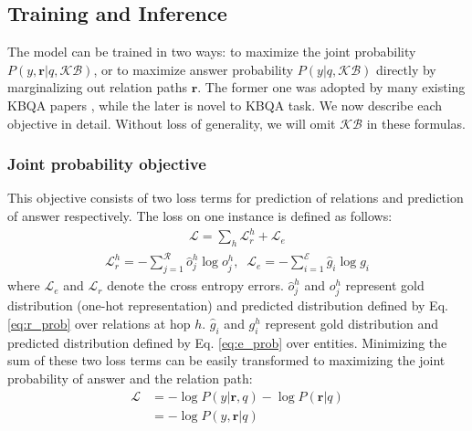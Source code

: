 \subsection{Training and Inference}

The model can be trained in two ways: to maximize the joint probability $P(y,\mathbf{r}|q,\mathcal{KB})$, or to maximize answer probability $P(y|q,\mathcal{KB})$ directly by marginalizing out relation paths $\mathbf{r}$. The former one was adopted by many existing KBQA papers \cite{DBLP:conf/coling/ZhouHZ18}, while the later is novel to KBQA task. We now describe each objective in detail. Without loss of generality, we will omit $\mathcal{KB}$ in these formulas.



\subsubsection{Joint probability objective} This objective consists of two loss terms for prediction of relations and prediction of answer respectively. The loss on one instance is defined as follows:
\begin{align}
 \mathcal{L} = \sum_{h}\mathcal{L}_r^{h} + \mathcal{L}_e 
 \end{align}
  \vspace{-3ex}
\begin{align}
 \mathcal{L}_r^{h} = -\sum_{j=1}^{\mathcal{R}}\hat{o}^h_j\log{o^h_j},\;\;\mathcal{L}_e = -\sum_{i=1}^{\mathcal{E}}\hat{g}_i\log{g_i}
\end{align}
where $\mathcal{L}_e$ and $\mathcal{L}_r$ denote the cross entropy errors. $\hat{o}^h_j$ and $o^h_j$ represent gold distribution (one-hot representation) and predicted distribution defined by Eq. \ref{eq:r_prob} over relations at hop $h$. $\hat{g}_i$ and $g^h_i$ represent gold distribution and predicted distribution defined by Eq. \ref{eq:e_prob} over entities. Minimizing the sum of these two loss terms can be easily transformed to maximizing the joint probability of answer and the relation path:
\begin{equation}
\begin{aligned}
\mathcal{L} &= -\log P(y|\mathbf{r},q) - \log P(\mathbf{r}|q) \\
            &= -\log P(y,\mathbf{r}|q)
\end{aligned}
\end{equation}

